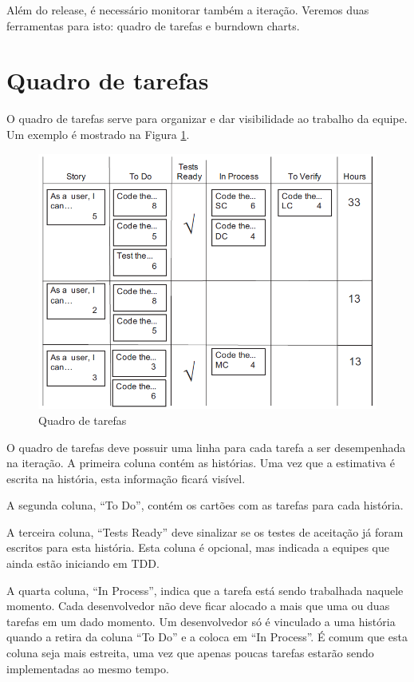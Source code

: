 \documentclass[a4paper,abntfigtabnum,noindentfirst]{abnt}
\begin{document}
Além do release, é necessário monitorar também a iteração. Veremos duas ferramentas para isto: quadro de tarefas e burndown charts.

\section{Quadro de tarefas}

O quadro de tarefas serve para organizar e dar visibilidade ao trabalho da equipe. Um exemplo é mostrado na Figura \ref{quadro-de-tarefas}.

\begin{figure}
  \caption{Quadro de tarefas}
  \label{quadro-de-tarefas}
  \begin{center}
  \includegraphics[scale=0.6]{quadro-de-tarefas}
  \end{center}
\end{figure}

O quadro de tarefas deve possuir uma linha para cada tarefa a ser desempenhada na iteração.  A primeira coluna contém as histórias. Uma vez que a estimativa é escrita na história, esta informação ficará visível.

A segunda coluna, ``To Do'', contém os cartões com as tarefas para cada história.

A terceira coluna, ``Tests Ready'' deve sinalizar se os testes de aceitação já foram escritos para esta história. Esta coluna é opcional, mas indicada a equipes que ainda estão iniciando em TDD.

A quarta coluna, ``In Process'', indica que a tarefa está sendo trabalhada naquele momento. Cada desenvolvedor não deve ficar alocado a mais que uma ou duas tarefas em um dado momento. Um desenvolvedor só é vinculado a uma história quando a retira da coluna ``To Do'' e a coloca em ``In Process''. É comum que esta coluna seja mais estreita, uma vez que apenas poucas tarefas estarão sendo implementadas ao mesmo tempo.
\end{document}
